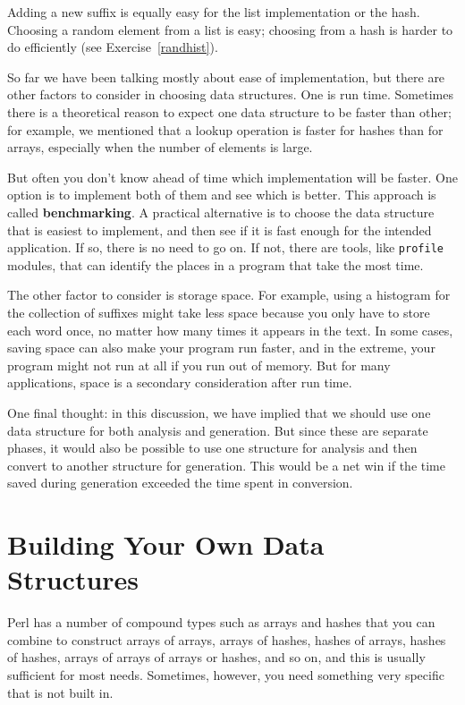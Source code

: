 Adding a new suffix is equally easy for the list implementation
or the hash.  Choosing a random element from a list
is easy; choosing from a hash is harder to do
efficiently (see Exercise~\ref{randhist}).

So far we have been talking mostly about ease of implementation,
but there are other factors to consider in choosing data structures.
One is run time.  Sometimes there is a theoretical reason to expect
one data structure to be faster than other; for example, we mentioned
that a lookup operation is faster for hashes than for arrays,
especially when the number of elements is large.

But often you don't know ahead of time which implementation will
be faster.  One option is to implement both of them and see which
is better.  This approach is called {\bf benchmarking}.  A practical
alternative is to choose the data structure that is
easiest to implement, and then see if it is fast enough for the
intended application.  If so, there is no need to go on.  If not,
there are tools, like {\tt profile} modules, that can identify
the places in a program that take the most time.

The other factor to consider is storage space.  For example, using a
histogram for the collection of suffixes might take less space because
you only have to store each word once, no matter how many times it
appears in the text.  In some cases, saving space can also make your
program run faster, and in the extreme, your program might not run at
all if you run out of memory.  But for many applications, space is a
secondary consideration after run time.

One final thought: in this discussion, we have implied that
we should use one data structure for both analysis and generation.  But
since these are separate phases, it would also be possible to use one
structure for analysis and then convert to another structure for
generation.  This would be a net win if the time saved during
generation exceeded the time spent in conversion.

\section{Building Your Own Data Structures}

Perl has a number of compound types such as arrays and hashes 
that you can combine to construct arrays of arrays, arrays of 
hashes, hashes of arrays, hashes of hashes, arrays of arrays of 
arrays or hashes, and so on, and this is usually sufficient for 
most needs. Sometimes, however, you need something very specific 
that is not built in.

